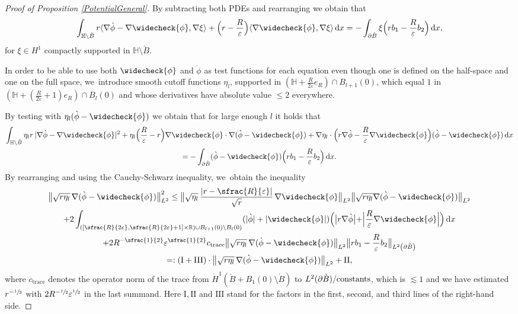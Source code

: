 \documentclass[JEP,XML,SOM,Unicode,published]{cedram}
\let\epsilon\varepsilon
\let\backslash\setminus
\newcommand{\constants}{\textup{constants}}
\newcommand{\rI}{\mathrm{I}}
\newcommand{\rII}{\mathrm{II}}
\newcommand{\rIII}{\mathrm{III}}
\theoremstyle{definition}
\newcommand\R{\mathbb{R}}
\newcommand\bnorm[1]{\bigl\lVert #1\bigr\rVert}
\newcommand\scalar[2]{\langle #1,#2\rangle}
\newcommand\eq{=}
\newcommand\dd{\,\mathrm{d}}
\newcommand\dx{\dd x}
\let\chek\widecheck
\let\de\partial
\let\eps\epsilon
\begin{document}
\begin{proof}[Proof of Proposition \ref{PotentialGeneral}]

By subtracting both PDEs and rearranging we obtain that
\begin{equation}\label{Elliptic1}
\int_{\mathbb{H}\backslash\grave{B}} r\scalar{\nabla\grave{\phi}-\nabla\chek{\phi}}{\nabla \xi}+\Bigl(r-\frac{R}{\eps}\Bigr)\scalar{\nabla\chek{\phi}}{ \nabla\xi}\dx\eq-\int_{\de\grave{B}} \xi\Bigl(rb_1-\frac{R}{\eps}b_2\Bigr)\dx,
\end{equation}
for $\xi\in H^1$ compactly supported in $\mathbb{H}\backslash\grave{B}$.

In order to be able to use both $\chek{\phi}$ and $\grave{\phi}$ as test functions for each equation even though one is defined on the half-space and one on the full space, we~introduce smooth cutoff functions $\eta_l$, supported in $(\mathbb{H}+\frac{R}{2\eps}e_R)\cap B_{l+1}(0)$, which equal $1$ in \linebreak$(\mathbb{H}+(\frac{R}{2\eps}+1)e_R)\cap B_l(0)$ and whose derivatives have absolute value $\leq 2$ everywhere.

By testing with $\eta_l(\grave{\phi}-\chek{\phi})$ we obtain that for large enough $l$ it holds that
\begin{multline*}
\int_{\mathbb{H}\backslash\grave{B}} \eta_l r\,|\nabla\grave{\phi}-\nabla\chek{\phi}|^2+\eta_l \Bigl(\frac{R}{\eps}-r\Bigr)\nabla\chek{\phi}\cdot \nabla(\grave{\phi}-\chek{\phi})+\nabla\eta_l\cdot\Bigl(r\nabla\grave{\phi}-\frac{R}{\eps}\nabla\chek{\phi}\Bigr)(\grave{\phi}-\chek{\phi}) \dx\\
\eq-\int_{\de\grave{B}}(\grave{\phi}-\chek{\phi})\Bigl(rb_1-\frac{R}{\eps}b_2\Bigr)\dx.
\end{multline*}
By rearranging and using the Cauchy-Schwarz inequality, we~obtain the inequality
\begin{multline*}
\bnorm{\sqrt{r\eta_l}\,\nabla(\grave{\phi}-\chek{\phi})}_{L^2}^2\leq \bnorm{\sqrt{\eta_l}\,\frac{|r-\sfrac{R}{\eps}|}{\sqrt{r}}\,\nabla\chek{\phi}}_{L^2}\bnorm{\sqrt{r\eta_l}\nabla(\grave{\phi}-\chek{\phi})}_{L^2}\\
+2\int_{\left([\sfrac{R}{2\eps},\sfrac{R}{2\eps}+1]\times \R\right)\cup B_{l+1}\left(0\right)\backslash B_l\left(0\right)}(|\grave{\phi}|+|\chek{\phi}|)\Bigl(\bigl|r\nabla\grave{\phi}\bigl|+\Bigl|\frac{R}{\eps}\nabla\chek{\phi}\Bigr|\Bigr)\dx\\
+2R^{-\sfrac{1}{2}}\eps^{\sfrac{1}{2}}c_\mathrm{trace}\bnorm{\sqrt{r\eta_l}\,\nabla(\grave{\phi}-\chek{\phi})}_{L^2}\bnorm{rb_1-\frac{R}{\eps}b_2}_{L^2\left(\de \grave{B}\right)}\\
=: (\rI+\rIII)\cdot \bnorm{\sqrt{r\eta_l}\,\nabla(\grave{\phi}-\chek{\phi})}_{L^2}+\rII,
\end{multline*}
where $c_\mathrm{trace}$ denotes the operator norm of the trace from $\dot{H}^{1}(\grave{B}+B_1(0)\backslash \grave{B})$ to \linebreak $L^2(\de \grave{B})/\constants$, which is $\lesssim 1$ and we have estimated $r^{-\sfrac{1}{2}}$ with $2R^{-\sfrac{1}{2}}\eps^{\sfrac{1}{2}}$ in the last summand. Here $\rI,\rII$ and $\rIII$ stand for the factors in the first, second, and third lines of the right-hand side.


\end{proof}
\end{document}
